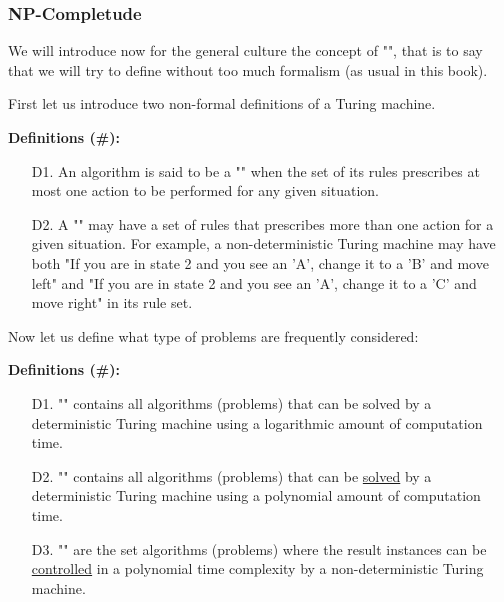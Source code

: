 	\subsubsection{NP-Completude}\label{np completude}
	We will introduce now for the general culture the concept of "", that is to say that we will try to define without too much formalism (as usual in this book).
	
	First let us introduce two non-formal definitions of a Turing machine.
	
	\textbf{Definitions (\#\mydef):}
	\begin{enumerate}
		\item[D1.] An algorithm is said to be a "" when the set of its rules prescribes at most one action to be performed for any given situation.
		
		\item[D2.] A "" may have a set of rules that prescribes more than one action for a given situation. For example, a non-deterministic Turing machine may have both "If you are in state 2 and you see an 'A', change it to a 'B' and move left" and "If you are in state 2 and you see an 'A', change it to a 'C' and move right" in its rule set.
	\end{enumerate}
	
	Now let us define what type of problems are frequently considered:
	
	\textbf{Definitions (\#\mydef):}
	
	\begin{enumerate}
		\item[D1.] "" contains all algorithms (problems) that can be solved by a deterministic Turing machine using a logarithmic amount of computation time.
		
		\item[D2.] "" contains all algorithms (problems) that can be \underline{solved} by a deterministic Turing machine using a polynomial amount of computation time.
		
		\item[D3.] "" are the set algorithms (problems) where the result instances can be \underline{controlled} in a polynomial time complexity by a non-deterministic Turing machine. 
	\end{enumerate}
	
